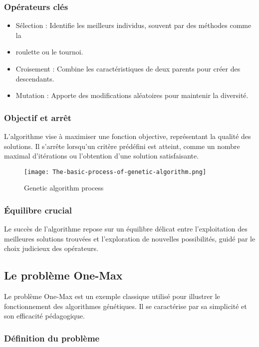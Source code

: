 \documentclass{article}
\begin{document}
\subsubsection{Opérateurs clés}
\begin{itemize}
    \item Sélection : Identifie les meilleurs individus, souvent par des méthodes comme la \item roulette ou le tournoi.
    \item Croisement : Combine les caractéristiques de deux parents pour créer des descendants.
    \item Mutation : Apporte des modifications aléatoires pour maintenir la diversité.
\end{itemize}

\subsubsection{Objectif et arrêt}
L'algorithme vise à maximiser une fonction objective, représentant la qualité des solutions. Il s'arrête lorsqu'un critère prédéfini est atteint, comme un nombre maximal d'itérations ou l'obtention d'une solution satisfaisante.

\begin{figure}
    \centering
    \texttt{[image: The-basic-process-of-genetic-algorithm.png]}
    \caption{Genetic algorithm process}
    \label{fig:enter-label}
\end{figure}

\subsubsection{Équilibre crucial}
 Le succès de l'algorithme repose sur un équilibre délicat entre l'exploitation des meilleures solutions trouvées et l'exploration de nouvelles possibilités, guidé par le choix judicieux des opérateurs.


\subsection{Le problème One-Max}

Le problème One-Max est un exemple classique utilisé pour illustrer le fonctionnement des algorithmes génétiques. Il se caractérise par sa simplicité et son efficacité pédagogique.

\subsubsection{Définition du problème}
\end{document}

